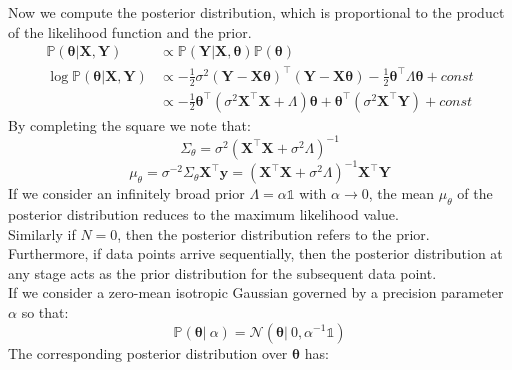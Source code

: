 \documentclass[twoside]{article}
\begin{document}
Now we compute the posterior distribution, which is proportional to the product of the likelihood function and the prior.
\begin{equation*}
\begin{aligned}
    \mathbb{P}(\boldsymbol{\theta}| \boldsymbol{X}, \boldsymbol{Y}) &\propto \mathbb{P}(\boldsymbol{Y}|\boldsymbol{X},\boldsymbol{\theta}) \mathbb{P}(\boldsymbol{\theta})\\
    \log\mathbb{P}(\boldsymbol{\theta}| \boldsymbol{X}, \boldsymbol{Y}) &\propto -\frac{1}{2}\sigma^2(\boldsymbol{Y} - \boldsymbol{X}\boldsymbol{\theta})^\intercal(\boldsymbol{Y} - \boldsymbol{X}\boldsymbol{\theta}) - \frac{1}{2}\boldsymbol{\theta}^\intercal\Lambda\boldsymbol{\theta} + const\\
    &\propto -\frac{1}{2}\boldsymbol{\theta}^\intercal(\sigma^2\boldsymbol{X}^\intercal\boldsymbol{X} + \Lambda)\boldsymbol{\theta} + \boldsymbol{\theta}^\intercal(\sigma^2\boldsymbol{X}^\intercal\boldsymbol{Y}) + const
\end{aligned}
\end{equation*}
By completing the square we note that:
\begin{equation*}
    \Sigma_{\theta} = \sigma^{2}(\boldsymbol{X}^{\intercal}\boldsymbol{X} + \sigma^{2}\Lambda)^{-1}
\end{equation*}
\begin{equation*}
    \mu_{\theta} = \sigma^{-2}\Sigma_{\theta}\boldsymbol{X}^{\intercal}\boldsymbol{y} = (\boldsymbol{X}^{\intercal}\boldsymbol{X} + \sigma^{2}\Lambda)^{-1}\boldsymbol{X}^{\intercal}\boldsymbol{Y}
\end{equation*}
If we consider an infinitely broad prior $\Lambda = \alpha\mathds{1}$ with $\alpha \to 0$, the mean $\mu_\theta$ of the posterior distribution reduces to the maximum likelihood value.\\
Similarly if $N = 0$, then the posterior distribution refers to the prior.\\
Furthermore, if data points arrive sequentially, then the posterior distribution at any stage acts as the prior distribution for the subsequent data point.\\
If we consider a zero-mean isotropic Gaussian governed by a precision parameter $\alpha$ so that:
\begin{equation*}
    \mathbb{P}(\boldsymbol{\theta}|\:\alpha) = \mathcal{N}(\boldsymbol{\theta}|\:0,\alpha^{-1}\mathds{1})
\end{equation*}
The corresponding posterior distribution over $\boldsymbol{\theta}$ has:
\end{document}
